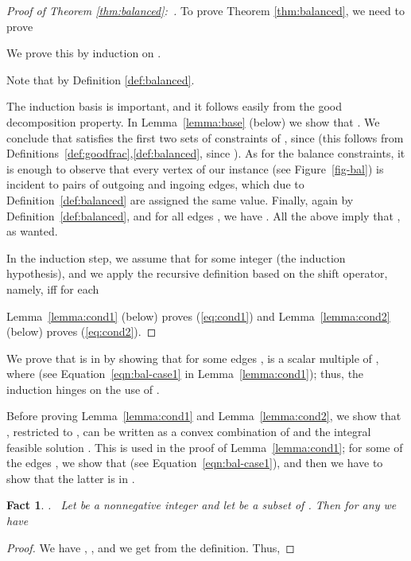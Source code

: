 \documentclass[11pt]{article}
\newtheorem{fact}[theorem]{Fact}
\begin{document}
\begin{proof}[Proof of Theorem \ref{thm:balanced}:~]
To prove Theorem \ref{thm:balanced}, we need to prove

We prove this by induction on .

Note that  by Definition \ref{def:balanced}.

The induction basis is important, and it follows easily from the
good decomposition property.
In Lemma~\ref{lemma:base} (below) we show that
. 
We conclude that  satisfies the first two sets of constraints of 
, since 
(this follows from Definitions~\ref{def:goodfrac},\ref{def:balanced}, since
). As for the balance constraints, it is enough to observe that every vertex of our instance (see Figure~\ref{fig-bal}) is incident to pairs of outgoing and ingoing edges, which due to Definition~\ref{def:balanced} are assigned the same value. Finally, again by Definition~\ref{def:balanced}, and for all edges , we have . All the above imply that , as wanted. 

In the induction step, we assume that
 for some integer 
(the induction hypothesis),
and we apply the recursive definition based
on the shift operator,
namely,
 iff for each 

Lemma~\ref{lemma:cond1} (below) proves (\ref{eq:cond1}) and
Lemma~\ref{lemma:cond2} (below) proves (\ref{eq:cond2}).
\end{proof}

We prove that  is in 
by showing that for some edges ,
 is a scalar multiple of  ,
where 
(see Equation~\eqref{eqn:bal-case1} in Lemma~\ref{lemma:cond1});
thus, the induction hinges on the use of .


Before proving Lemma~\ref{lemma:cond1} and Lemma~\ref{lemma:cond2},
we show that , restricted to ,
can be written as a convex combination
of  and the integral feasible solution .
This is used in the proof of Lemma~\ref{lemma:cond1};
for some of the edges ,
we show that 
(see Equation~\eqref{eqn:bal-case1}),
and then we have to show that the latter is in .


\begin{fact}.~ \label{fact:recursive}
Let  be a nonnegative integer and let  be a subset of .
Then for any  we have \qquad

\end{fact}
\begin{proof}
We have , , and
we get  from the definition. Thus,

\end{proof}
\end{document}
